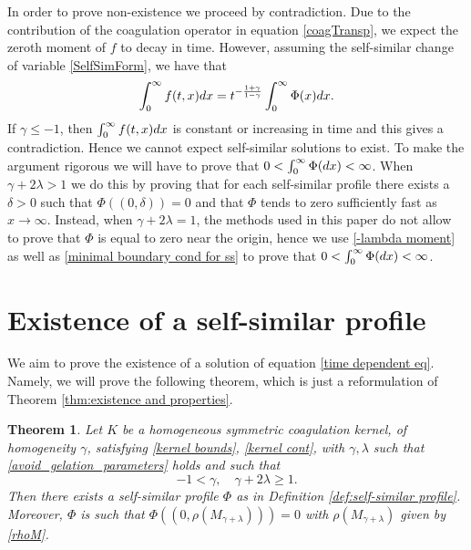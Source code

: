 \documentclass[11pt]{article}
\numberwithin{equation}{section}
\theoremstyle{plain}
\newtheorem{theorem}{Theorem}[section]
\newcommand{\der}{\textup{d}}
\begin{document}
In order to prove non-existence we proceed by contradiction. 
Due to the contribution of the coagulation operator in equation \eqref{coagTransp}, we expect the zeroth moment of $f$ to decay in time. 
However, assuming the self-similar change of variable \eqref{SelfSimForm}, we have that 
\[
\int_0^\infty f(t, x) \der x = t^{- \frac{1+\gamma}{1-\gamma} } \int_0^\infty \Phi(x) \der x. 
\] 
If $\gamma \leq  -1 $, then $\int_0^\infty f(t, x) \der x $ is constant or increasing in time and this gives a contradiction. Hence we cannot expect self-similar solutions to exist. 
To make the argument rigorous we will have to prove that $0< \int_0^\infty \Phi(\der x ) < \infty $. 
When $\gamma + 2 \lambda > 1 $ we do this by proving that for each self-similar profile there exists a $\delta >0$ such that $\Phi((0, \delta))=0$ and that $ \Phi$ tends to zero sufficiently fast as $x \rightarrow \infty $. 
Instead, when $\gamma + 2 \lambda =1 $, the methods used in this paper do not allow to prove that $\Phi$ is equal to zero near the origin, hence we use \eqref{-lambda moment} as well as \eqref{minimal boundary cond for ss} to prove that $0< \int_0^\infty \Phi(\der x ) < \infty $.

\section{Existence of a self-similar profile}\label{sec:exifstence}
We aim to prove the existence of a solution of equation \eqref{time dependent eq}. 
Namely, we will prove the following theorem, which is just a reformulation of Theorem \ref{thm:existence and properties}.
\begin{theorem} \label{thm:existence}
Let $K$ be a homogeneous symmetric coagulation kernel, of homogeneity $\gamma$, satisfying
\eqref{kernel bounds}, \eqref{kernel cont}, with $\gamma , \lambda $ such that  \eqref{avoid_gelation_parameters} holds and such that
\[
-1 < \gamma, \quad \gamma+2\lambda \geq 1.
\] 
Then there exists a self-similar profile $\Phi$ as in Definition \ref{def:self-similar profile}.
Moreover, $\Phi$ is such that $\Phi((0, \rho(M_{\gamma+\lambda})))=0$ with $\rho(M_{\gamma+\lambda})$ given by \eqref{rhoM}. 
\end{theorem}
\end{document}
